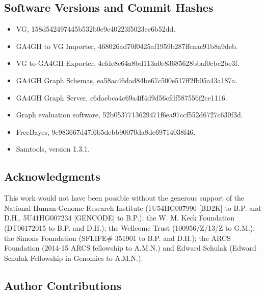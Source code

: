 \subsection{Software Versions and Commit Hashes}

\begin{itemize}
\item[] VG, 158d542497445b532b0e9e40223f5023ee6b52dd.

\item[] GA4GH to VG Importer, 468026ad70f0425af1959b287ffcaac91b8a9deb.

\item[] VG to GA4GH Exporter, 4efde8e64a8bd113a0e83685628bbaf0cbc2be3f.

\item[] GA4GH Graph Schemas, ea58ac46dad84be67c500e517ff2fb05a43a187a.

\item[] GA4GH Graph Server, c6daebca4c69a4ff4d9d56cfdf587556f2ce1116.

\item[] Graph evaluation software, 52b0537713629471f6ea97ccf552d6727c630f3d.

\item[] FreeBayes, 9e983667d47f6b5dcbb90070da8de69714038f46.

\item[] Samtools, version 1.3.1.
\end{itemize}

\subsection{Acknowledgments}

This work would not have been possible without the generous support of
the National Human Genome Research Institute (1U54HG007990 {[}BD2K{]} to
B.P. and D.H., 5U41HG007234 {[}GENCODE{]} to B.P.); the W. M. Keck
Foundation (DT06172015 to B.P. and D.H.); the Wellcome Trust
(100956/Z/13/Z to G.M.); the Simons Foundation (SFLIFE\# 351901 to B.P.
and D.H.); the ARCS Foundation (2014-15 ARCS fellowship to A.M.N.) and
Edward Schulak (Edward Schulak Fellowship in Genomics to A.M.N.).

\subsection{Author Contributions}

